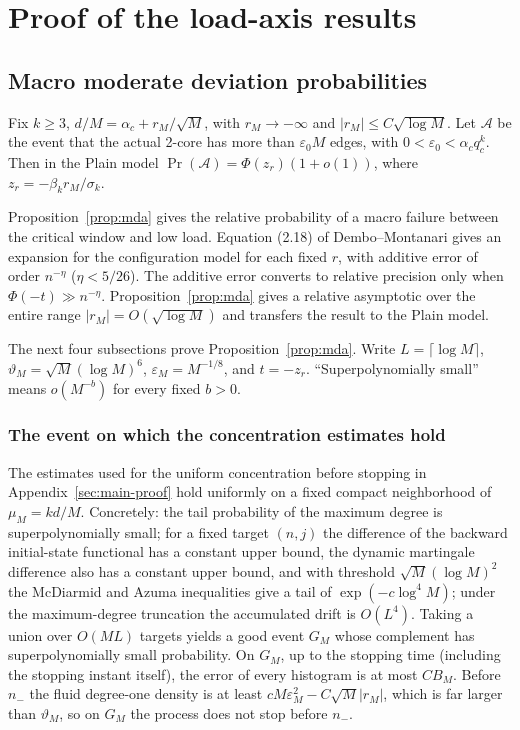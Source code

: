 \section{Proof of the load-axis results}\label{app:loadaxis}
\subsection{Macro moderate deviation probabilities}\label{app:mda}
\begin{proposition}\label{prop:mda}
Fix $k\ge3$, $d/M=\alpha_c+r_M/\sqrt M$, with $r_M\to-\infty$ and
$|r_M|\le C\sqrt{\log M}$. Let $\mathcal A$ be the event that the actual 2-core has more than
$\varepsilon_0M$ edges, with $0<\varepsilon_0<\alpha_cq_c^k$. Then in the Plain model
$\Pr(\mathcal A)=\Phi(z_r)(1+o(1))$, where $z_r=-\beta_kr_M/\sigma_k$.
\end{proposition}
Proposition~\ref{prop:mda} gives the relative probability of a macro failure between the critical
window and low load. Equation (2.18) of Dembo--Montanari gives an expansion for the configuration
model for each fixed $r$, with additive error of order $n^{-\eta}$ ($\eta<5/26$)\cite{dm}. The
additive error converts to relative precision only when $\Phi(-t)\gg n^{-\eta}$.
Proposition~\ref{prop:mda} gives a relative asymptotic over the entire range
$|r_M|=O(\sqrt{\log M})$ and transfers the result to the Plain model.

The next four subsections prove Proposition~\ref{prop:mda}. Write $L=\lceil\log M\rceil$,
$\vartheta_M=\sqrt M(\log M)^6$, $\varepsilon_M=M^{-1/8}$, and $t=-z_r$. ``Superpolynomially
small'' means $o(M^{-b})$ for every fixed $b>0$.

\subsubsection{The event on which the concentration estimates hold}
The estimates used for the uniform concentration before stopping in Appendix~\ref{sec:main-proof}
hold uniformly on a fixed compact neighborhood of $\mu_M=kd/M$. Concretely: the tail probability
of the maximum degree is superpolynomially small; for a fixed target $(n,j)$ the difference of the
backward initial-state functional has a constant upper bound, the dynamic martingale difference
also has a constant upper bound, and with threshold $\sqrt M(\log M)^2$ the McDiarmid and Azuma
inequalities give a tail of $\exp(-c\log^4M)$; under the maximum-degree truncation the accumulated
drift is $O(L^4)$. Taking a union over $O(ML)$ targets yields a good event $G_M$ whose complement
has superpolynomially small probability. On $G_M$, up to the stopping time (including the stopping
instant itself), the error of every histogram is at most $CB_M$. Before $n_-$ the fluid degree-one
density is at least $cM\varepsilon_M^2-C\sqrt M|r_M|$, which is far larger than $\vartheta_M$, so
on $G_M$ the process does not stop before $n_-$.

